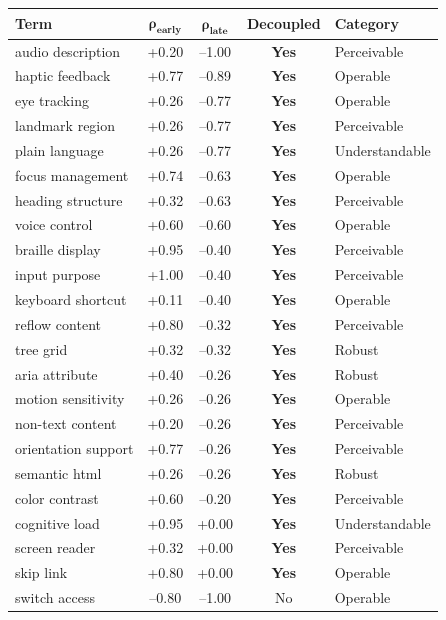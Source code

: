 \documentclass[10pt]{article} %
\begin{document}
\begin{table}[H]
\centering
\scriptsize
\begin{tabular}{|l|c|c|c|l|}
\hline
\textbf{Term} & $\mathbf{\rho_\text{early}}$ & $\mathbf{\rho_\text{late}}$ & \textbf{Decoupled} & \textbf{Category} \\
\hline
audio description & +0.20 & --1.00 & \textbf{Yes} & Perceivable \\
haptic feedback & +0.77 & --0.89 & \textbf{Yes} & Operable \\
eye tracking & +0.26 & --0.77 & \textbf{Yes} & Operable \\
landmark region & +0.26 & --0.77 & \textbf{Yes} & Perceivable \\
plain language & +0.26 & --0.77 & \textbf{Yes} & Understandable \\
focus management & +0.74 & --0.63 & \textbf{Yes} & Operable \\
heading structure & +0.32 & --0.63 & \textbf{Yes} & Perceivable \\
voice control & +0.60 & --0.60 & \textbf{Yes} & Operable \\
braille display & +0.95 & --0.40 & \textbf{Yes} & Perceivable \\
input purpose & +1.00 & --0.40 & \textbf{Yes} & Perceivable \\
keyboard shortcut & +0.11 & --0.40 & \textbf{Yes} & Operable \\
reflow content & +0.80 & --0.32 & \textbf{Yes} & Perceivable \\
tree grid & +0.32 & --0.32 & \textbf{Yes} & Robust \\
aria attribute & +0.40 & --0.26 & \textbf{Yes} & Robust \\
motion sensitivity & +0.26 & --0.26 & \textbf{Yes} & Operable \\
non-text content & +0.20 & --0.26 & \textbf{Yes} & Perceivable \\
orientation support & +0.77 & --0.26 & \textbf{Yes} & Perceivable \\
semantic html & +0.26 & --0.26 & \textbf{Yes} & Robust \\
color contrast & +0.60 & --0.20 & \textbf{Yes} & Perceivable \\
cognitive load & +0.95 & +0.00 & \textbf{Yes} & Understandable \\
screen reader & +0.32 & +0.00 & \textbf{Yes} & Perceivable \\
skip link & +0.80 & +0.00 & \textbf{Yes} & Operable \\
switch access & --0.80 & --1.00 & No & Operable \\

\end{tabular}
\end{table}
\end{document}
